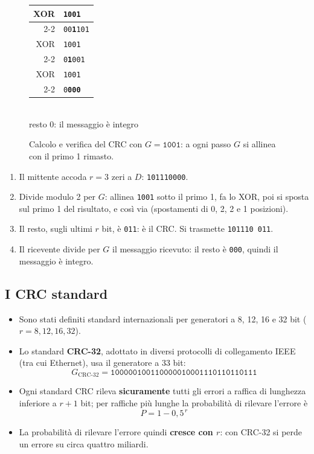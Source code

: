 \begin{figure}[H]
\begin{minipage}{0.47\linewidth}
\begin{tabular}{r@{\,}l}
XOR & \texttt{\phantom{00}1001\phantom{000}} \\ \cline{2-2}
& \texttt{\phantom{00}00\textbf{1}101\phantom{0}} \\
XOR & \texttt{\phantom{0000}1001\phantom{0}} \\ \cline{2-2}
& \texttt{\phantom{0000}0\textbf{1}001} \\
XOR & \texttt{\phantom{00000}1001} \\ \cline{2-2}
& \texttt{\phantom{00000}0\textcolor{netgreen!60!black}{\textbf{000}}} \\
\end{tabular}\\[4pt]
{\small resto 0: il messaggio è integro}
\end{minipage}
\caption{Calcolo e verifica del CRC con $G = \texttt{1001}$: a ogni passo $G$ si allinea con il primo 1 rimasto.}
\end{figure}

\begin{enumerate}
    \item Il mittente accoda $r = 3$ zeri a $D$: \texttt{101110000}.
    \item Divide modulo 2 per $G$: allinea \texttt{1001} sotto il primo 1, fa lo XOR, poi si sposta sul primo 1 del risultato, e così via
          (spostamenti di 0, 2, 2 e 1 posizioni).
    \item Il resto, sugli ultimi $r$ bit, è \texttt{011}: è il CRC. Si trasmette \texttt{101110\,011}.
    \item Il ricevente divide per $G$ il messaggio ricevuto: il resto è \texttt{000}, quindi il messaggio è integro.
\end{enumerate}


\subsection{I CRC standard}

\begin{itemize}
    \item Sono stati definiti standard internazionali per generatori a 8, 12, 16 e 32 bit ($r = 8, 12, 16, 32$).
    \item Lo standard \textbf{CRC-32}, adottato in diversi protocolli di collegamento IEEE (tra cui Ethernet), usa il generatore a 33 bit:
          $$G_{\text{CRC-32}} = \texttt{100000100110000010001110110110111}$$
    \item Ogni standard CRC rileva \textbf{sicuramente} tutti gli errori a raffica di lunghezza inferiore a $r+1$ bit; per raffiche più
          lunghe la probabilità di rilevare l'errore è
          $$P = 1 - 0{,}5^{\,r}$$
    \item La probabilità di rilevare l'errore quindi \textbf{cresce con $r$}: con CRC-32 si perde un errore su circa quattro miliardi.
\end{itemize}

